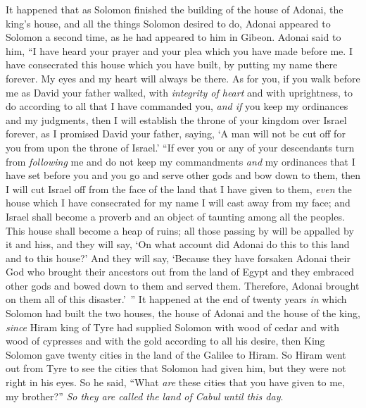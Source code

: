 \begin{biblechapter} %
 It happened that as Solomon finished the building of the house of Adonai, the king’s house, and all the things Solomon desired to do,
\verse Adonai appeared to Solomon a second time, as he had appeared to him in Gibeon.
\verse Adonai said to him, “I have heard your prayer and your plea which you have made before me. I have consecrated this house which you have built, by putting my name there forever. My eyes and my heart will always be there.
\verse As for you, if you walk before me as David your father walked, with \textit{integrity of heart} and with uprightness, to do according to all that I have commanded you, \textit{and if} you keep my ordinances and my judgments,
\verse then I will establish the throne of your kingdom over Israel forever, as I promised David your father, saying, ‘A man will not be cut off for you from upon the throne of Israel.’
\verse “If ever you or any of your descendants turn from \textit{following} me and do not keep my commandments \textit{and} my ordinances that I have set before you and you go and serve other gods and bow down to them,
\verse then I will cut Israel off from the face of the land that I have given to them, \textit{even} the house which I have consecrated for my name I will cast away from my face; and Israel shall become a proverb and an object of taunting among all the peoples.
\verse This house shall become a heap of ruins; all those passing by will be appalled by it and hiss, and they will say, ‘On what account did Adonai do this to this land and to this house?’
\verse And they will say, ‘Because they have forsaken Adonai their God who brought their ancestors out from the land of Egypt and they embraced other gods and bowed down to them and served them. Therefore, Adonai brought on them all of this disaster.’ ”
 It happened at the end of twenty years \textit{in} which Solomon had built the two houses, the house of Adonai and the house of the king,
\verse \textit{since} Hiram king of Tyre had supplied Solomon with wood of cedar and with wood of cypresses and with the gold according to all his desire, then King Solomon gave twenty cities in the land of the Galilee to Hiram.
\verse So Hiram went out from Tyre to see the cities that Solomon had given him, but they were not right in his eyes.
\verse So he said, “What \textit{are} these cities that you have given to me, my brother?” \textit{So they are called the land of Cabul until this day}.

\end{biblechapter}
